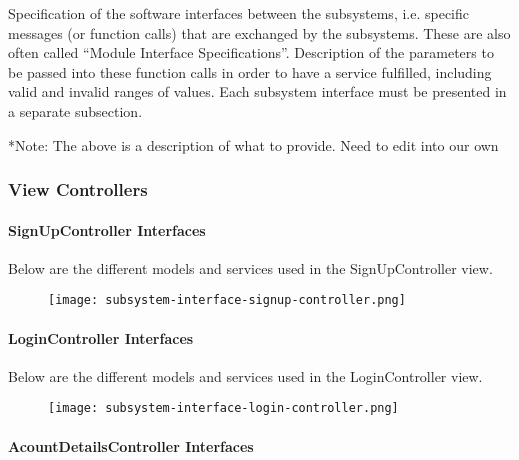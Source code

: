 \documentclass[12pt]{article}
\begin{document}

Specification of the software interfaces between the subsystems,
i.e. specific messages (or function calls) that are exchanged by the subsystems.
These are also often called ``Module Interface Specifications''.
Description of the parameters to be passed into these function calls in order to have a service fulfilled,
including valid and invalid ranges of values.
Each subsystem interface must be presented in a separate subsection.

*Note: The above is a description of what to provide. Need to edit into our own
\subsubsection{View Controllers}

\paragraph{SignUpController Interfaces}

Below are the different models and services used in the SignUpController view.

\begin{figure}[H]
\texttt{[image: subsystem-interface-signup-controller.png]}
\end{figure}

\clearpage

\paragraph{LoginController Interfaces}

Below are the different models and services used in the LoginController view.

\begin{figure}[H]
\texttt{[image: subsystem-interface-login-controller.png]}
\end{figure}

\clearpage

\paragraph{AcountDetailsController Interfaces}
\end{document}
